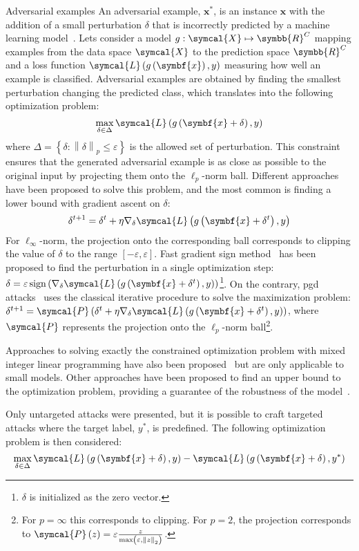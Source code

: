 \documentclass[../main.tex]{subfiles}
\begin{document}
	\begin{mybox}[label={box:adversarial}]{Adversarial examples}
		An adversarial example, \(\symbf{x}^{\ast}\), is an instance \(\symbf{x}\) with the addition of a small perturbation \(\delta\) that is incorrectly predicted by a machine learning model~\cite{Szegedy2013IntriguingPO}.
		Lets consider a model \(g:\symcal{X} \mapsto \symbb{R}^{C} \) mapping examples from the data space \(\symcal{X}\) to the prediction space \(\symbb{R}^{C}\) and a loss function \(\symcal{L}\left(g\left(\symbf{x}\right), y \right)\) measuring how well an example is classified.
		Adversarial examples are obtained by finding the smallest perturbation changing the predicted class, which translates into the following optimization problem:
		\[\max_{\delta \in \Delta} \symcal{L}\left(g\left(\symbf{x}+\delta\right), y \right)\]
		where \(\Delta = \left\{\delta: \left\|\delta\right\|_{p} \leq \varepsilon \right\}\) is the allowed set of perturbation.
		This constraint ensures that the generated adversarial example is as close as possible to the original input by projecting them onto the \(\ell_{p}\)-norm ball.
		Different approaches have been proposed to solve this problem, and the most common is finding a lower bound with gradient ascent on \(\delta\):
		\[\delta^{t+1} = \delta^{t} + \eta \nabla_{\delta}\symcal{L}\left(g\left(\symbf{x}+\delta^{t}\right), y \right)\]
		For \(\ell_{\infty}\)-norm, the projection onto the corresponding ball corresponds to clipping the value of \(\delta\) to the range \(\left[-\varepsilon, \varepsilon\right]\).
		Fast gradient sign method~\cite{FGSM} has been proposed to find the perturbation in a single optimization step: \(\delta = \varepsilon \operatorname{sign}\left(\nabla_{\delta}\symcal{L}\left(g\left(\symbf{x}+\delta^{t}\right), y \right)\right)\)\footnote{\(\delta\) is initialized as the zero vector.}.
		On the contrary, \gls{pgd} attacks~\cite{PGDAttacks,PGDAttacks2} uses the classical iterative procedure to solve the maximization problem: \(\delta^{t+1} = \symcal{P}\left(\delta^{t} + \eta \nabla_{\delta}\symcal{L}\left(g\left(\symbf{x}+\delta^{t}\right), y \right)\right)\), where \(\symcal{P}\) represents the projection onto the \(\ell_{p}\)-norm ball\footnote{For \(p = \infty\) this corresponds to clipping. For \(p =2\), the projection corresponds to \(\symcal{P}\left(z\right) = \varepsilon \frac{z}{\max\left(\varepsilon, \left\|z\right\|_{2}\right)}\).}.

		Approaches to solving exactly the constrained optimization problem with mixed integer linear programming have also been proposed~\cite{tjeng2018evaluating} but are only applicable to small models.
		Other approaches have been proposed to find an upper bound to the optimization problem, providing a guarantee of the robustness of the model~\cite{pmlr-v80-wong18a}.

		Only untargeted attacks were presented, but it is possible to craft targeted attacks where the target label, \(y^{\ast}\), is predefined.
		The following optimization problem is then considered:
		\[\max_{\delta \in \Delta} \symcal{L}\left(g\left(\symbf{x}+\delta\right), y \right) - \symcal{L}\left(g\left(\symbf{x}+\delta\right), y^{\ast} \right)\]
	\end{mybox}
\end{document}
